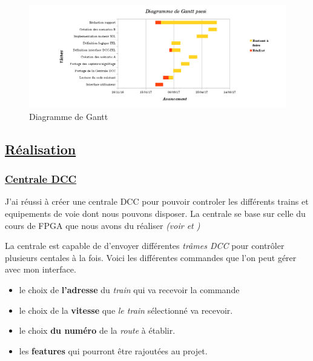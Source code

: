 \begin{figure}[h]
\centering
\includegraphics[scale=0.5]{gantt.png}
\caption{Diagramme de Gantt}
\label{gantt}
\end{figure}


\subsection{\underline{Réalisation}}
\label{sec:Réal}

\subsubsection{\underline{Centrale DCC}}
\label{sec:Centrale}

J'ai réussi à créer une centrale DCC pour pouvoir controler les
différents trains et equipements de voie dont nous pouvons
disposer. La centrale se base sur celle du cours de FPGA que nous
avons du réaliser \emph{(voir \cite{rapport} et \cite{sujet})}

La centrale est capable de d'envoyer différentes \emph{trâmes DCC}
pour contrôler plusieurs centales à la fois. Voici les différentes
commandes que l'on peut gérer avec mon interface.


\begin{itemize}
    \item le choix de \textbf{l'adresse} du \emph{train} qui va
      recevoir la commande
    \item le choix de la \textbf{vitesse} que \emph{le train} s\'electionn\'e
      va recevoir. 
    \item le choix  \textbf{du numéro} de la \emph{route} \`a \'etablir.
    \item les \textbf{features} qui pourront \^etre rajout\'ees au
      projet. 
  \end{itemize}

\newpage

